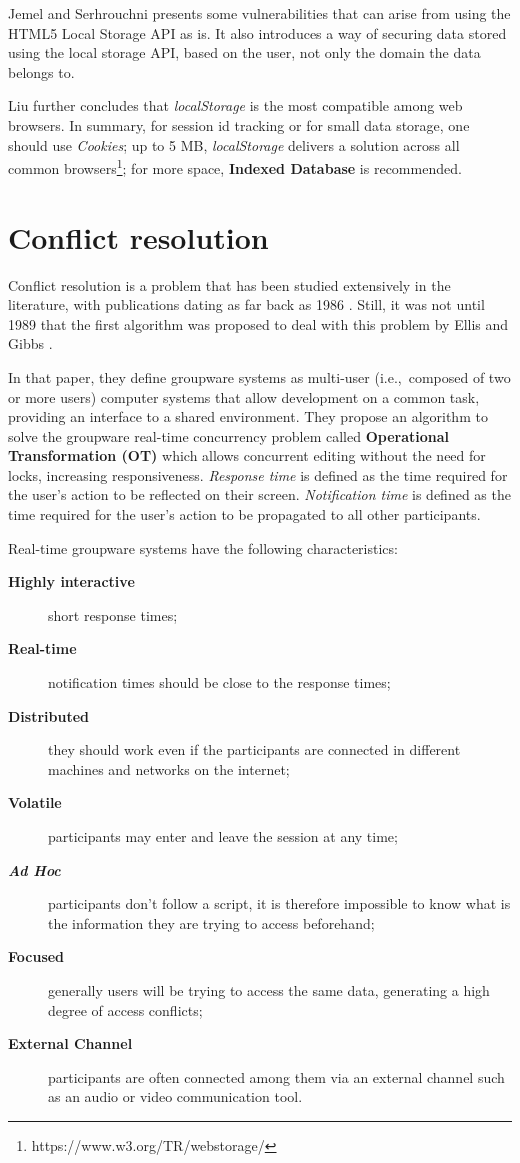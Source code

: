 Jemel and Serhrouchni \cite{Jemel2014} presents some vulnerabilities that can arise from using the HTML5 Local Storage API as is. It also introduces a way of securing data stored using the local storage API, based on the user, not only the domain the data belongs to.

Liu further concludes that \textit{localStorage} is the most compatible among web browsers. In summary, for session id tracking or for small data storage, one should use \textit{Cookies}; up to 5 MB, \textit{localStorage} delivers a solution across all common browsers\footnote{https://www.w3.org/TR/webstorage/}; for more space, \textbf{Indexed Database} is recommended.

\section{Conflict resolution}\label{sec:conflict-res-sota}

Conflict resolution is a problem that has been studied extensively in the literature, with publications dating as far back as 1986 \cite{Greif1986}. Still, it was not until 1989 that the first algorithm was proposed to deal with this problem by Ellis and Gibbs \cite{Ellis1989}.

In that paper, they define groupware systems as multi-user (i.e.,\ composed of two or more users) computer systems that allow development on a common task, providing an interface to a shared environment. They propose an algorithm to solve the groupware real-time concurrency problem called \textbf{Operational Transformation (OT)} which allows concurrent editing without the need for locks, increasing responsiveness. \textit{Response time} is defined as the time required for the user's action to be reflected on their screen. \textit{Notification time} is defined as the time required for the user's action to be propagated to all other participants.

Real-time groupware systems have the following characteristics:

\begin{description}
    \item[\textbf{Highly interactive}] short response times;
    \item[\textbf{Real-time}] notification times should be close to the response times;
    \item[\textbf{Distributed}] they should work even if the participants are connected in different machines and networks on the internet;
    \item[\textbf{Volatile}] participants may enter and leave the session at any time;
    \item[\textbf{\textit{Ad Hoc}}] participants don't follow a script, it is therefore impossible to know what is the information they are trying to access beforehand;
    \item[\textbf{Focused}] generally users will be trying to access the same data, generating a high degree of access conflicts;
    \item[\textbf{External Channel}] participants are often connected among them via an external channel such as an audio or video communication tool.
\end{description}

